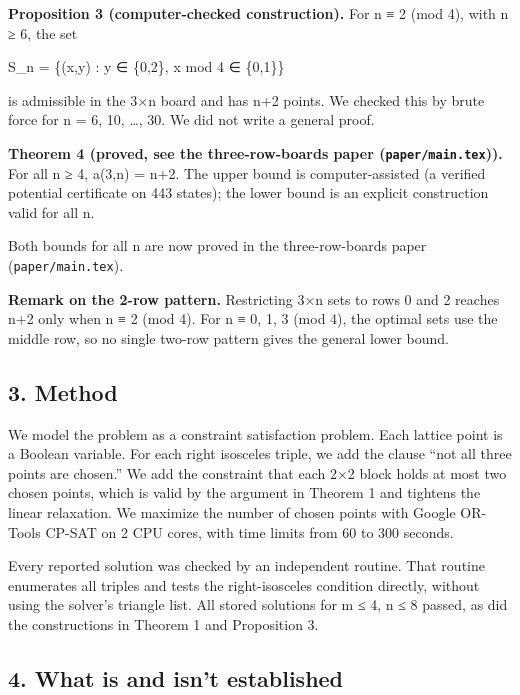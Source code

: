 \documentclass[
  11pt,
]{article}
\begin{document}
\textbf{Proposition 3 (computer-checked construction).} For n ≡ 2 (mod
4), with n ≥ 6, the set

S\_n = \{(x,y) : y ∈ \{0,2\}, x mod 4 ∈ \{0,1\}\}

is admissible in the 3×n board and has n+2 points. We checked this by
brute force for n = 6, 10, \ldots, 30. We did not write a general proof.

\textbf{Theorem 4 (proved, see the three-row-boards paper
(\texttt{paper/main.tex})).} For all n ≥ 4, a(3,n) = n+2. The upper
bound is computer-assisted (a verified potential certificate on 443
states); the lower bound is an explicit construction valid for all n.

Both bounds for all n are now proved in the three-row-boards paper
(\texttt{paper/main.tex}).

\textbf{Remark on the 2-row pattern.} Restricting 3×n sets to rows 0 and
2 reaches n+2 only when n ≡ 2 (mod 4). For n ≡ 0, 1, 3 (mod 4), the
optimal sets use the middle row, so no single two-row pattern gives the
general lower bound.

\subsection{3. Method}\label{method}

We model the problem as a constraint satisfaction problem. Each lattice
point is a Boolean variable. For each right isosceles triple, we add the
clause ``not all three points are chosen.'' We add the constraint that
each 2×2 block holds at most two chosen points, which is valid by the
argument in Theorem 1 and tightens the linear relaxation. We maximize
the number of chosen points with Google OR-Tools CP-SAT on 2 CPU cores,
with time limits from 60 to 300 seconds.

Every reported solution was checked by an independent routine. That
routine enumerates all triples and tests the right-isosceles condition
directly, without using the solver's triangle list. All stored solutions
for m ≤ 4, n ≤ 8 passed, as did the constructions in Theorem 1 and
Proposition 3.

\subsection{4. What is and isn't
established}\label{what-is-and-isnt-established}
\end{document}
